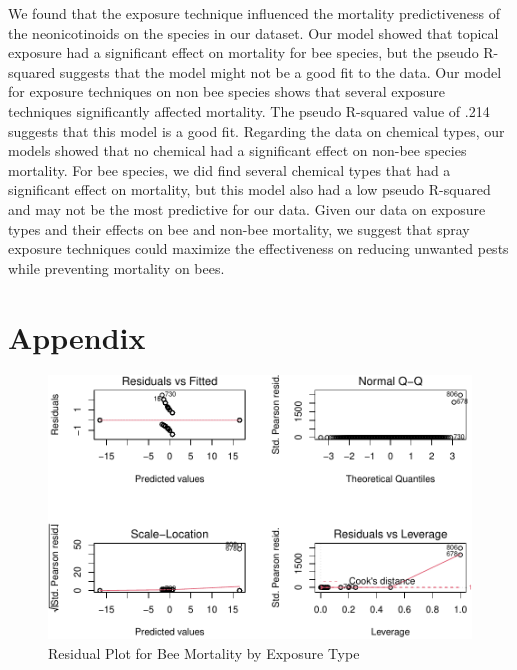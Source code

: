 \documentclass[
  12pt,
]{article}
\begin{document}
We found that the exposure technique influenced the mortality
predictiveness of the neonicotinoids on the species in our dataset. Our
model showed that topical exposure had a significant effect on mortality
for bee species, but the pseudo R-squared suggests that the model might
not be a good fit to the data. Our model for exposure techniques on non
bee species shows that several exposure techniques significantly
affected mortality. The pseudo R-squared value of .214 suggests that
this model is a good fit. Regarding the data on chemical types, our
models showed that no chemical had a significant effect on non-bee
species mortality. For bee species, we did find several chemical types
that had a significant effect on mortality, but this model also had a
low pseudo R-squared and may not be the most predictive for our data.
Given our data on exposure types and their effects on bee and non-bee
mortality, we suggest that spray exposure techniques could maximize the
effectiveness on reducing unwanted pests while preventing mortality on
bees.

\newpage

\hypertarget{appendix}{%
\section{Appendix}\label{appendix}}

\begin{figure}
\centering
\includegraphics{UpdatedwithModel_files/figure-latex/unnamed-chunk-8-1.pdf}
\caption{Residual Plot for Bee Mortality by Exposure Type}
\end{figure}

\newpage
\end{document}
